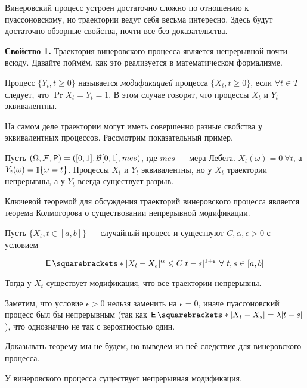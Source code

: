 Винеровский процесс устроен достаточно сложно по отношению к пуассоновскому, но
траектории ведут себя весьма интересно. Здесь будут достаточно обзорные свойства,
почти все без доказательства.

\textbf{Свойство 1.} Траектория винеровского процесса является непрерывной почти всюду. Давайте
  поймём, как это реализуется в математическом формализме.

\begin{definition}
  Процесс $\{Y_t, t \geq 0\}$ называется \textit{модификацией} процесса $\{X_t, t \geq 0\}$,
  если $\forall t \in T$ следует, что $\Pr{X_t = Y_t} = 1$. В этом случае говорят,
  что процессы $X_t$ и $Y_t$ эквивалентны.
\end{definition}

На самом деле траектории могут иметь совершенно разные свойства у эквивалентных
процессов. Рассмотрим показательный пример.

\begin{example}
  Пусть $(\Omega, \F, \Pr) = ([0, 1], \B[0, 1], mes)$, где $mes$ --- мера Лебега.
  $X_t(\omega) = 0 \ \forall t$, а $Y_t(\omega) = \mathop{\mathbf{I}}\{\omega = t\}$. Процессы
  $X_t$ и $Y_t$ эквивалентны, но у $X_t$ траектории непрерывны, а у $Y_t$ всегда
  существует разрыв.
\end{example}

Ключевой теоремой для обсуждения траекторий винеровского процесса является теорема
Колмогорова о существовании непрерывной модификации.

\begin{theorem}
  Пусть $\{X_t, t \in [a, b]\}$ --- случайный процесс и существуют $C, \alpha,
  \epsilon > 0$ с условием

  \[
    \E{|X_t - X_s|^\alpha} \leq C|t - s|^{1+ \epsilon} \ \forall \ t, s \in [a, b]
  \]

  Тогда у $X_t$ существует модификация, что все траектории непрерывны.
\end{theorem}

Заметим, что условие $\epsilon > 0$ нельзя заменить на $\epsilon = 0$, иначе пуассоновский
процесс был бы непрерывным (так как $\E{|X_t - X_s|} = \lambda|t - s|$), что однозначно не так
с вероятностью один.

Доказывать теорему мы не будем, но выведем из неё следствие для винеровского процесса.

\begin{lemma}
  У винеровского процесса существует непрерывная модификация.
\end{lemma}

